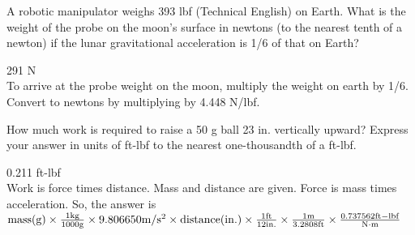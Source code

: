 \begin{question}[subtitle=Patrick F. Dunn Sol. 2.10]
A robotic manipulator weighs 393 lbf (Technical English) on Earth.
What is the weight of the probe on the moon’s surface in newtons (to the nearest tenth of a newton) if the lunar gravitational acceleration is 1/6 of that on Earth?
\examspace*{5em}

\end{question}
\begin{solution}
291 N \\ 
To arrive at the probe weight on the moon, multiply the weight on earth
by 1/6. Convert to newtons by multiplying by 4.448 N/lbf.


\end{solution}



\begin{question}[subtitle=Patrick F. Dunn Sol. 2.11]
How much work is required to raise a 50 g ball 23 in. vertically upward?
Express your answer in units of ft-lbf to the nearest one-thousandth of a ft-lbf.
\examspace*{5em}

\end{question}
\begin{solution}
0.211 ft-lbf \\ 
Work is force times distance. Mass and distance are given. Force is mass
times acceleration. So, the answer is \\
${\rm mass(g) \times \frac{1 kg}{1000 g} \times 9.806650 m / s^2 \times distance(in.) \times \frac{1 ft}{12 in.} \times \frac{1 m }{3.2808 ft} \times \frac{0.737562 ft-lbf}{ N \cdot m}}$


\end{solution}

